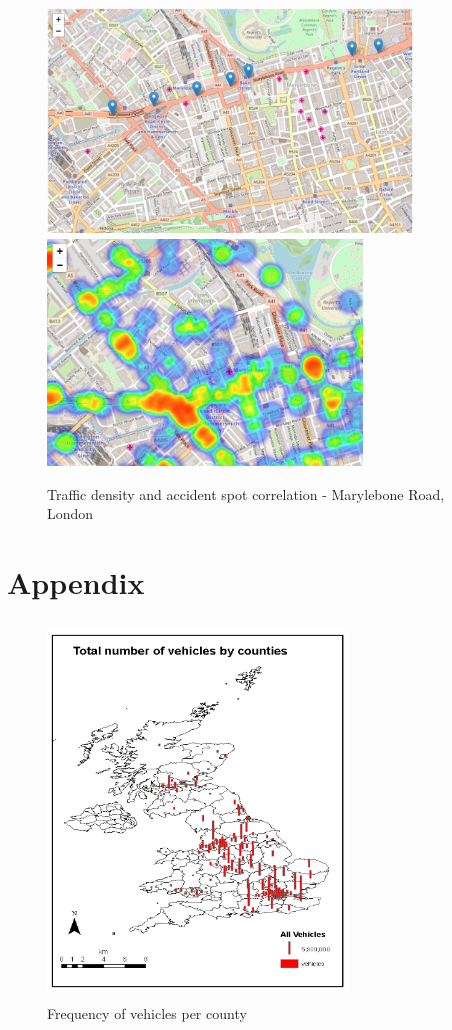 \documentclass{neu_handout}
\begin{document}
\begin{figure}[!htb]
  \includegraphics[height=6cm, width=\linewidth]{traffic-bakers-street.png}
\endminipage\hfill
{}
  \includegraphics[height=6cm, width=\linewidth]{accident-2009-heatmap-bakers-street.png}
  \endminipage
\caption{Traffic density and accident spot correlation - Marylebone Road, London}  
\end{figure}


\pagebreak
\section{Appendix}
\begin{figure}[!htb]
  \includegraphics[width=8cm, height=10cm]{vehicles-by-county.png}
  \caption{Frequency of vehicles per county}
\end{figure}
\end{document}
